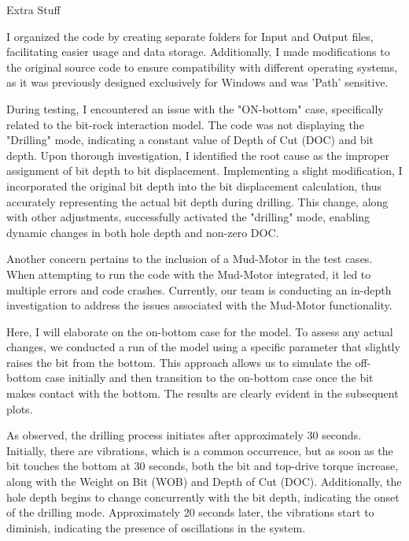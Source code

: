  Extra Stuff
 

 
I organized the code by creating separate folders for Input and Output files, facilitating easier usage and data storage. Additionally, I made modifications to the original source code to ensure compatibility with different operating systems, as it was previously designed exclusively for Windows and was 'Path' sensitive.

During testing, I encountered an issue with the "ON-bottom" case, specifically related to the bit-rock interaction model. The code was not displaying the "Drilling" mode, indicating a constant value of Depth of Cut (DOC) and bit depth. Upon thorough investigation, I identified the root cause as the improper assignment of bit depth to bit displacement. Implementing a slight modification, I incorporated the original bit depth into the bit displacement calculation, thus accurately representing the actual bit depth during drilling. This change, along with other adjustments, successfully activated the "drilling" mode, enabling dynamic changes in both hole depth and non-zero DOC.

Another concern pertains to the inclusion of a Mud-Motor in the test cases. When attempting to run the code with the Mud-Motor integrated, it led to multiple errors and code crashes. Currently, our team is conducting an in-depth investigation to address the issues associated with the Mud-Motor functionality. 

Here, I will elaborate on the on-bottom case for the model. To assess any actual changes, we conducted a run of the model using a specific parameter that slightly raises the bit from the bottom. This approach allows us to simulate the off-bottom case initially and then transition to the on-bottom case once the bit makes contact with the bottom. The results are clearly evident in the subsequent plots.

As observed, the drilling process initiates after approximately 30 seconds. Initially, there are vibrations, which is a common occurrence, but as soon as the bit touches the bottom at 30 seconds, both the bit and top-drive torque increase, along with the Weight on Bit (WOB) and Depth of Cut (DOC). Additionally, the hole depth begins to change concurrently with the bit depth, indicating the onset of the drilling mode. Approximately 20 seconds later, the vibrations start to diminish, indicating the presence of oscillations in the system. 

